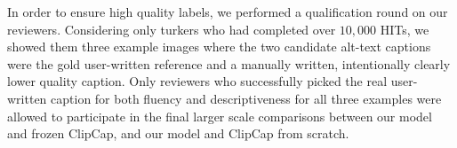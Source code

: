 \documentclass{article} %
\begin{document}
In order to ensure high quality labels, we performed a qualification round on our reviewers.
Considering only turkers who had completed over $10,000$ HITs, we showed them three example images where the two candidate alt-text captions were the gold user-written reference and a manually written, intentionally clearly lower quality caption.
Only reviewers who successfully picked the real user-written caption for both fluency and descriptiveness for all three examples were allowed to participate in the final larger scale comparisons between our model and frozen ClipCap, and our model and ClipCap from scratch.
\end{document}
